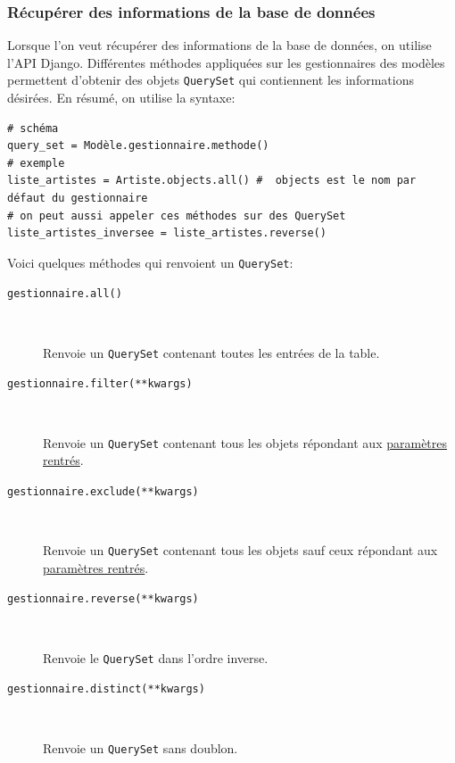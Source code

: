 \documentclass[a4paper, 10pt]{article}
\begin{document}
\subsubsection{Récupérer des informations de la base de données}
Lorsque  l'on veut récupérer des informations de la base de données, on utilise l'API Django. Différentes méthodes appliquées sur les gestionnaires des modèles permettent d'obtenir des objets \texttt{QuerySet} qui contiennent les informations désirées. En résumé, on utilise la syntaxe:
\begin{verbatim}
# schéma
query_set = Modèle.gestionnaire.methode()
# exemple
liste_artistes = Artiste.objects.all() #  objects est le nom par défaut du gestionnaire
# on peut aussi appeler ces méthodes sur des QuerySet
liste_artistes_inversee = liste_artistes.reverse()
\end{verbatim}
Voici quelques méthodes qui renvoient un \texttt{QuerySet}:

\begin{description}
    \item[\texttt{gestionnaire.all()}]~

          Renvoie un \texttt{QuerySet} contenant toutes les entrées de la table.

    \item[\texttt{gestionnaire.filter(**kwargs)}]~

          Renvoie un \texttt{QuerySet} contenant tous les objets répondant aux \href{https://docs.djangoproject.com/fr/2.0/ref/models/querysets/#field-lookups}{paramètres rentrés}.

    \item[\texttt{gestionnaire.exclude(**kwargs)}]~

          Renvoie un \texttt{QuerySet} contenant tous les objets sauf ceux répondant aux \href{https://docs.djangoproject.com/fr/2.0/ref/models/querysets/#field-lookups}{paramètres rentrés}.

    \item[\texttt{gestionnaire.reverse(**kwargs)}]~

          Renvoie le \texttt{QuerySet} dans l'ordre inverse.

    \item[\texttt{gestionnaire.distinct(**kwargs)}]~

          Renvoie un \texttt{QuerySet} sans doublon.
\end{description}
\end{document}
